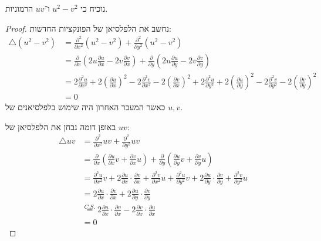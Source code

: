 \Subquestion{}
נוכיח כי $u^2 - v^2$ ו־$uv$ הרמוניות.
\begin{proof}
	נחשב את הלפלסיאן של הפונקציות החדשות:
	\begin{align*}
		\triangle (u^2 - v^2)
		& = \frac{\partial^2}{\partial x^2}(u^2 - v^2) + \frac{\partial^2}{\partial y^2}(u^2 - v^2) \\
		& = \frac{\partial}{\partial x}(2u \frac{\partial u}{\partial x} - 2v \frac{\partial v}{\partial x}) + \frac{\partial}{\partial y}(2u \frac{\partial u}{\partial y} - 2v \frac{\partial v}{\partial y}) \\
		& = 2\frac{\partial^2 u}{\partial x^2} + 2 {\left(\frac{\partial u}{\partial x}\right)}^2 - 2\frac{\partial^2 v}{\partial x^2} - 2 {\left( \frac{\partial v}{\partial x}\right)}^2
		+ 2\frac{\partial^2 u}{\partial y^2} + 2 {\left(\frac{\partial u}{\partial y}\right)}^2 - 2\frac{\partial^2 v}{\partial y^2} - 2 {\left( \frac{\partial v}{\partial y}\right)}^2 \\
		& = 0
	\end{align*}
	כאשר המעבר האחרון היה שימוש בלפלסיאנים של $u, v$.

	באופן דומה נבחן את הלפלסיאן של $u v$:
	\begin{align*}
		\triangle u v
		& = \frac{\partial^2}{\partial x^2} u v + \frac{\partial^2}{\partial y^2} u v \\
		& = \frac{\partial}{\partial x} (\frac{\partial u}{\partial x} v + \frac{\partial v}{\partial x} u) + \frac{\partial}{\partial y} (\frac{\partial u}{\partial y} v + \frac{\partial v}{\partial y} u) \\
		& = \frac{\partial^2 u}{\partial x^2} v + 2 \frac{\partial u}{\partial x} \cdot \frac{\partial v}{\partial x} + \frac{\partial^2 v}{\partial x^2} u +
		\frac{\partial^2 u}{\partial y^2} v + 2 \frac{\partial u}{\partial y} \cdot \frac{\partial v}{\partial y} + \frac{\partial^2 v}{\partial y^2} u \\
		& = 2 \frac{\partial u}{\partial x} \cdot \frac{\partial v}{\partial x} + 2 \frac{\partial u}{\partial y} \cdot \frac{\partial v}{\partial y} \\
		& \overset{C.S.}{=} 2 \frac{\partial u}{\partial x} \cdot \frac{\partial v}{\partial x} - 2 \frac{\partial v}{\partial x} \cdot \frac{\partial u}{\partial x} \\
		& = 0
	\end{align*}
\end{proof}

